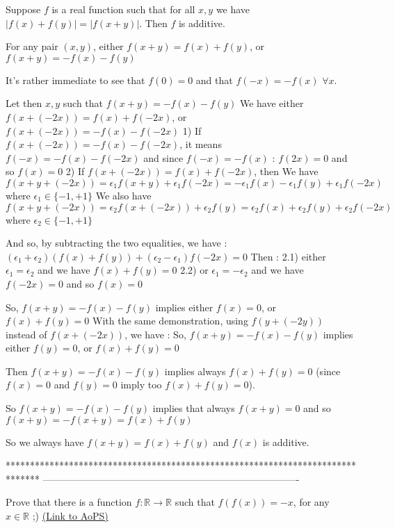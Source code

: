 \begin{mysolution}
	\begin{tcolorbox}Suppose $ f$ is a real function such that for all $ x,y$ we have $ |f(x) + f(y)| = |f(x + y)|$. Then $ f$ is additive.\end{tcolorbox}

For any pair $ (x,y)$, either $ f(x+y)=f(x)+f(y)$, or $ f(x+y)=-f(x)-f(y)$

It's rather immediate to see that $ f(0)=0$ and that $ f(-x)=-f(x)$ $ \forall x$.

Let then $ x,y$ such that $ f(x+y)=-f(x)-f(y)$
We have either $ f(x+(-2x))=f(x)+f(-2x)$, or $ f(x+(-2x))=-f(x)-f(-2x)$
1) If $ f(x+(-2x))=-f(x)-f(-2x)$, it means $ f(-x)=-f(x)-f(-2x)$ and since $ f(-x)=-f(x)$ : $ f(2x)=0$ and so $ f(x)=0$
2) If $ f(x+(-2x))=f(x)+f(-2x)$, then
We have $ f(x+y+(-2x))=\epsilon_1f(x+y)+\epsilon_1f(-2x)=-\epsilon_1f(x)-\epsilon_1f(y)+\epsilon_1f(-2x)$ where $ \epsilon_1\in\{-1,+1\}$
We also have $ f(x+y+(-2x))=\epsilon_2f(x+(-2x))+\epsilon_2f(y)=\epsilon_2f(x)+\epsilon_2f(y)+\epsilon_2f(-2x)$ where $ \epsilon_2\in\{-1,+1\}$

And so, by subtracting the two equalities, we have :
$ (\epsilon_1+\epsilon_2)(f(x)+f(y))+(\epsilon_2-\epsilon_1)f(-2x)=0$
Then :
2.1) either $ \epsilon_1=\epsilon_2$ and we have $ f(x)+f(y)=0$
2.2) or $ \epsilon_1=-\epsilon_2$ and we have $ f(-2x)=0$ and so $ f(x)=0$

So, $ f(x+y)=-f(x)-f(y)$ implies either $ f(x)=0$, or $ f(x)+f(y)=0$
With the same demonstration, using $ f(y+(-2y))$ instead of $ f(x+(-2x))$, we have :
So, $ f(x+y)=-f(x)-f(y)$ implies either $ f(y)=0$, or $ f(x)+f(y)=0$

Then $ f(x+y)=-f(x)-f(y)$ implies always $ f(x)+f(y)=0$ (since $ f(x)=0$ and $ f(y)=0$ imply too  $ f(x)+f(y)=0$).

So $ f(x+y)=-f(x)-f(y)$ implies that always $ f(x+y)=0$ and so $ f(x+y)=-f(x+y)=f(x)+f(y)$

So we always have $ f(x+y)=f(x)+f(y)$ and $ f(x)$ is additive.
\end{mysolution}
*******************************************************************************
-------------------------------------------------------------------------------

\begin{problem}
	Prove that there is a function $f:\mathbb{R}\to\mathbb{R}$ such that $f(f(x))=-x$, for any $x\in\mathbb{R}$ ;)
	\flushright \href{https://artofproblemsolving.com/community/c6h49191}{(Link to AoPS)}
\end{problem}



